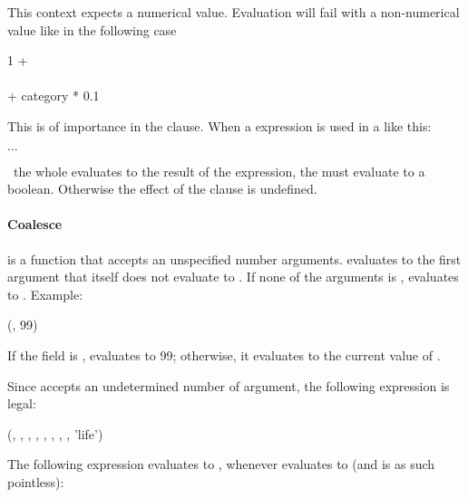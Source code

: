 This context expects a numerical value.
Evaluation will fail with a non-numerical value
like in the following case

 1 +
\\
\hspace*{2.5cm}  
  \\
\hspace*{2.5cm}  + category * 0.1 \\
\hspace*{2cm}

This is of importance in the  clause.
When a  expression is used in a 
like this:

  $\dots$ 

\ie\ the whole  evaluates to the result
of the  expression, the 
must evaluate to a boolean. Otherwise the effect of
the  clause is undefined.

\paragraph{Coalesce}
 is a function that accepts
an unspecified number arguments.
 evaluates to
the first argument that itself
does not evaluate to .
If none of the arguments is ,
 evaluates to .
Example:

(, 99)

If the field  is ,
 evaluates to 99;
otherwise, it evaluates to the current
value of .

Since  accepts
an undetermined number of argument,
the following expression is legal:

(,
                      ,
                      ,
                      ,
                      ,
                      ,
                      ,
                      ,
                      'life')

The following expression evaluates to ,
whenever  evaluates to 
(and is as such pointless):

